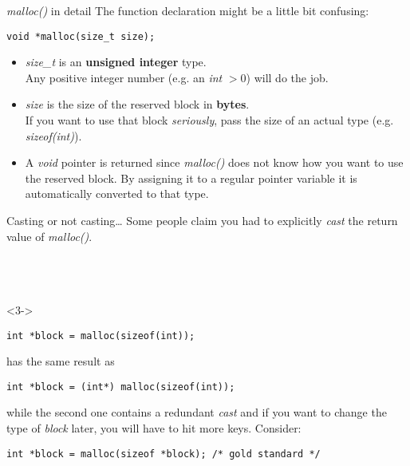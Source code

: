 \begin{frame}[fragile]{\textit{malloc()} in detail}
	The function declaration might be a little bit confusing:
	\begin{lstlisting}[numbers=none]
void *malloc(size_t size);
\end{lstlisting}
	\begin{itemize}
		\item \textit{size\_t} is an \textbf{unsigned integer} type. \\
		Any positive integer number (e.g. an \textit{int} $>0$) will do the job.
		\item \textit{size} is the size of the reserved block in \textbf{bytes}. \\
		If you want to use that block \textit{seriously}, pass the size of an actual type (e.g. \textit{sizeof(int)}).
		\item A \textit{void} pointer is returned since \textit{malloc()} does not know how you want to use the reserved block. By assigning it to a regular pointer variable it is automatically converted to that type.
	\end{itemize}
\end{frame}

\begin{frame}[fragile]{Casting or not casting\dots}
	Some people claim you had to explicitly \textit{cast} the return value of \textit{malloc()}.\\
	\ \\
	 \ \\
	\ \\
	\begin{onlyenv}<3->
		\begin{lstlisting}[numbers=none]
int *block = malloc(sizeof(int));
\end{lstlisting}
	has the same result as
	\begin{lstlisting}[numbers=none]
int *block = (int*) malloc(sizeof(int));
\end{lstlisting}
	while the second one contains a redundant \textit{cast} and if you want to change the type of \textit{block} later, you will have to hit more keys. Consider:
	\begin{lstlisting}[numbers=none]
int *block = malloc(sizeof *block); /* gold standard */
\end{lstlisting}
	\end{onlyenv}
\end{frame}

